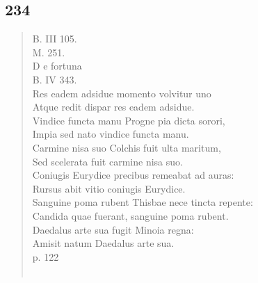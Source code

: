 \documentclass[11pt, a4paper]{report}
\begin{document}
            \subsection*{234}
      \begin{verse}
      B. III 105. \\ M. 251. \\ D e fortuna \\ B. IV 343. \\ Res eadem adsidue momento volvitur uno \\ Atque redit dispar res eadem adsidue. \\ Vindice functa manu Progne pia dicta sorori, \\ Impia sed nato vindice functa manu. \\ Carmine nisa suo Colchis fuit ulta maritum, \\ Sed scelerata fuit carmine nisa suo. \\ Coniugis Eurydice precibus remeabat ad auras: \\ Rursus abit vitio coniugis Eurydice. \\ Sanguine poma rubent Thisbae nece tincta repente: \\ Candida quae fuerant, sanguine poma rubent. \\ Daedalus arte sua fugit Minoia regna: \\ Amisit natum Daedalus arte sua. \\ p. 122 \\ 
        ﻿\pagebreak 

\end{verse}
\end{document}
